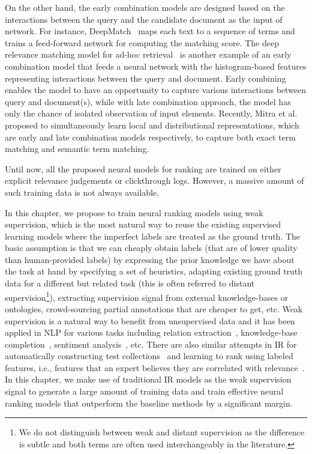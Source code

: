 On the other hand, the early combination models are designed based on the interactions between the query and the candidate document as the input of network. 
For instance, DeepMatch~\citep{Lu:2013} maps each text to a sequence of terms and trains a feed-forward network for computing the matching score. 
The deep relevance matching model for ad-hoc retrieval~\citep{Guo:2016} is another example of an early combination model that feeds a neural network with the  histogram-based features representing interactions between the query and document. 
Early combining enables the model to have an opportunity to capture various interactions between query and document(s), while with late combination approach, the model has only the chance of isolated observation of input elements. Recently, Mitra et al.~\citep{Mitra:2016} proposed to simultaneously learn local and distributional representations, which are early and late combination models respectively,  to capture both exact term matching and semantic term matching.

Until now, all the proposed neural models for ranking are trained on either explicit relevance judgements or clickthrough logs. However, a massive amount of such training data is not always available. 

In this chapter, we propose to train neural ranking models using weak supervision, which is the most natural way to reuse the existing supervised learning models where the imperfect labels are treated as the ground truth.
The basic assumption is that we can cheaply obtain labels (that are of lower quality than human-provided labels) by expressing the prior knowledge we have about the task at hand by specifying a set of heuristics, adapting existing ground truth data for a different but related task (this is often referred to distant supervision\footnote{We do not distinguish between weak and distant supervision as the difference is subtle and both terms are often used interchangeably in the literature.}), extracting supervision signal from external knowledge-bases or ontologies, crowd-sourcing partial annotations that are cheaper to get, etc.
%
Weak supervision is a natural way to benefit from unsupervised data and it has been applied in NLP for various tasks including relation extraction~\citep{Bing:2015,Han:2016}, knowledge-base completion~\citep{Hoffmann:2011}, sentiment analysis~\citep{Severyn:2015:SemEval}, etc.  
There are also similar attempts in IR for automatically constructing test collections~\citep{Asadi:2011} and learning to rank using labeled features, i.e., features that an expert believes they are correlated with relevance~\citep{Diaz:2016:ictir}.
In this chapter, we make use of traditional IR models as the weak supervision signal to generate a large amount of training data and train effective neural ranking models that outperform the baseline methods by a significant margin.



